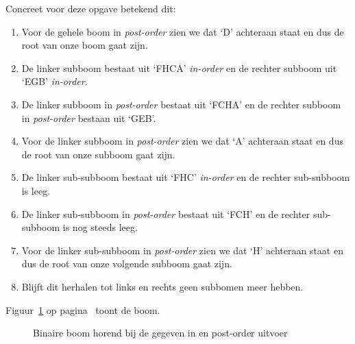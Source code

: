 \begin{oef}
\begin{opl}
Concreet voor deze opgave betekend dit:
\begin{enumerate}
	\item Voor de gehele boom in \emph{post-order} zien we dat ‘D’ achteraan staat en dus de root van onze boom gaat zijn.
	\item De linker subboom bestaat uit ‘FHCA’ \emph{in-order} en de rechter subboom uit ‘EGB’ \emph{in-order}.
	\item De linker subboom in \emph{post-order} bestaat uit ‘FCHA’ en de rechter subboom in \emph{post-order} bestaan uit ‘GEB’.
	\item Voor de linker subboom in \emph{post-order} zien we dat ‘A’ achteraan staat en dus de root van onze subboom gaat zijn.
	\item De linker sub-subboom bestaat uit ‘FHC’ \emph{in-order} en de rechter sub-subboom is leeg.
	\item De linker sub-subboom in \emph{post-order} bestaat uit ‘FCH’ en de rechter sub-subboom is nog steeds leeg.
	\item Voor de linker sub-subboom in \emph{post-order} zien we dat ‘H’ achteraan staat en dus de root van onze volgende subboom gaat zijn.
	\item Blijft dit herhalen tot links en rechts geen subbomen meer hebben.
\end{enumerate}
Figuur~\ref{fig:exjuni19inpost} op pagina~\pageref{fig:exjuni19inpost} toont de boom.
\begin{figure}[htbp]
    \centering
{}
\caption{Binaire boom horend bij de gegeven in en post-order uitvoer}
    \label{fig:exjuni19inpost}
\end{figure}
\end{opl}
\end{oef}


